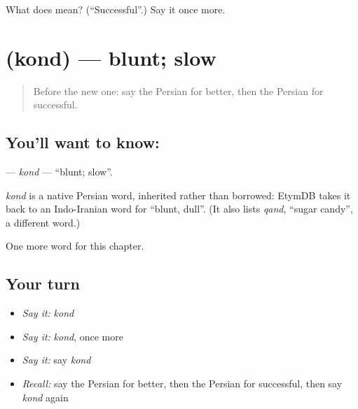 \begin{tcolorbox}[breakable,colback=teal!4,colframe=teal!35!black,title={Before you move on}]
What does  mean? (\textquotedblleft{}Successful\textquotedblright{}.) Say it once more.
\end{tcolorbox}
\section[\texorpdfstring{\fa{کند} (kond)}{کند (kond)}]{ (kond) — blunt; slow}

\label{lesson:FA-C164-kond}



\begin{quote}
Before the new one: say the Persian for better, then the Persian for successful.
\end{quote}

\subsection*{You'll want to know: }
\textbf{} — \emph{kond} — \textquotedblleft{}blunt; slow\textquotedblright{}.

\begin{cousinweb}
\emph{kond} is a native Persian word, inherited rather than borrowed: EtymDB takes it back to an Indo-Iranian word for \textquotedblleft{}blunt, dull\textquotedblright{}. (It also lists \emph{qand}, \textquotedblleft{}sugar candy\textquotedblright{}, a different word.)
\end{cousinweb}

\begin{grammarlens}[title={What you've built}]
One more word for this chapter.
\end{grammarlens}

\subsection*{Your turn}
\begin{itemize}
\raggedright
  \item \emph{Say it:} \emph{kond}
  \item \emph{Say it:} \emph{kond}, once more
  \item \emph{Say it:} say \emph{kond}
  \item \emph{Recall:} say the Persian for better, then the Persian for successful, then say \emph{kond} again
\end{itemize}

